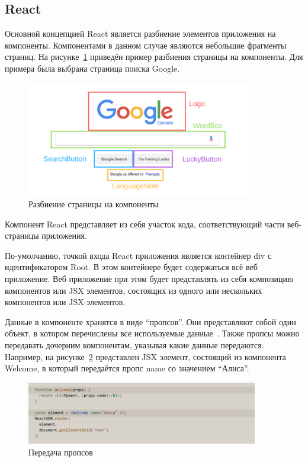 \subsection{React}

Основной концепцией React является разбиение элементов приложения на компоненты. Компонентами в данном случае являются небольшие фрагменты страниц. На рисунке~\ref{img:react__components} приведён пример разбиения страницы на компоненты. Для примера была выбрана страница поиска Google.

\begin{figure}[H]
  \centering
  \includegraphics[width=0.9\textwidth]{assets/images/theoretical2/components.png}
  \caption{Разбиение страницы на компоненты}
  \label{img:react__components}
\end{figure}

Компонент React представляет из себя участок кода, соответствующий части веб-страницы приложения.



По-умолчанию, точкой входа React приложения является контейнер div с идентификатором Root. В этом контейнере будет содержаться всё веб приложение. Веб приложение при этом будет представлять из себя композицию компонентов или JSX элементов, состоящих из одного или нескольких компонентов или JSX-элементов.

Данные в компоненте хранятся в виде ``пропсов''. Они представляют собой один объект, в котором перечислены все используемые данные~\cite{react}. Также пропсы можно передавать дочерним компонентам, указывая какие данные передаются. Например, на рисунке~\ref{img:react__props} представлен JSX элемент, состоящий из компонента Welcome, в который передаётся пропс name со значением ``Алиса''.

\begin{figure}[H]
  \centering
  \includegraphics[width=0.9\textwidth]{assets/images/theoretical2/props.png}
  \caption{Передача пропсов}
  \label{img:react__props}
\end{figure}

